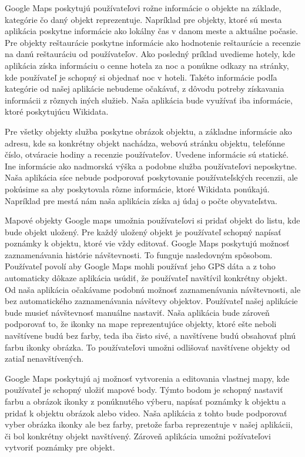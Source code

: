 Google Maps poskytujú používateľovi rožne informácie o objekte na základe, kategórie čo daný objekt reprezentuje. 
Napríklad pre objekty, ktoré sú mesta aplikácia poskytne informácie ako lokálny čas v danom meste a 
aktuálne počasie. 
Pre objekty reštaurácie poskytne informácie ako hodnotenie reštaurácie a recenzie na danú reštauráciu od používateľov. 
Ako posledný príklad uvedieme hotely, kde aplikácia získa informáciu o cenne hotela za noc a ponúkne odkazy na stránky, 
kde používateľ je schopný si objednať noc v hoteli. 
Takéto informácie podľa kategórie od našej aplikácie nebudeme očakávať, z dôvodu potreby získavania informácii z rôznych iných služieb. 
Naša aplikácia bude využívať iba informácie, ktoré poskytujúcu Wikidata. 

Pre všetky objekty služba poskytne obrázok objektu, a základne informácie ako adresu, kde sa konkrétny objekt nachádza, 
webovú stránku objektu, telefónne číslo, otváracie hodiny a recenzie používateľov. Uvedene informácie sú statické. Ine informácie ako nadmorská výška a podobne služba používateľovi neposkytne. 
Naša aplikácia síce nebude podporovať poskytovanie používateľských recenzii, ale pokúsime sa aby poskytovala rôzne informácie, ktoré Wikidata ponúkajú. 
Napríklad pre mestá nám naša aplikácia získa aj údaj o počte obyvateľstva. 

Mapové objekty Google maps umožnia používateľovi si pridať objekt do listu, kde bude objekt uložený. Pre každý uložený objekt je používateľ schopný 
napísať poznámky k objektu, ktoré vie vždy editovať. Google Maps poskytujú možnosť zaznamenávania histórie návštevnosti. To funguje nasledovným spôsobom. Používateľ 
povolí aby Google Maps mohli používať jeho GPS dáta a z toho automaticky dôkaze aplikácia usúdiť, že používateľ navštívil konkrétny objekt. 
Od naša aplikácia očakávame podobnú možnosť zaznamenávania návštevnosti, ale bez automatického zaznamenávania návštevy objektov. Používateľ našej 
aplikácie bude musieť návštevnosť manuálne nastaviť. Naša aplikácia bude zároveň podporovať to, že ikonky na mape reprezentujúce objekty, ktoré 
ešte neboli navštívene budú bez farby, teda iba čisto sivé, a navštívene budú obsahovať plnú farbu ikonky obrázka. To používateľovi umožni odlišovať navštívene objekty od zatiaľ nenavštívených.  

Google Maps poskytujú aj možnosť vytvorenia a editovania vlastnej mapy, kde používateľ je schopný uložiť mapové body. 
Týmto bodom je schopný nastaviť farbu a obrázok ikonky z ponúknutého výberu, napísať poznámky k objektu a pridať k objektu obrázok alebo video. 
Naša aplikácia z tohto bude podporovať vyber obrázka ikonky ale bez farby, pretože farba reprezentuje v našej aplikácii, či bol konkrétny objekt navštívený.
Zároveň aplikácia umožni požívateľovi vytvoriť poznámky pre objekt. 

